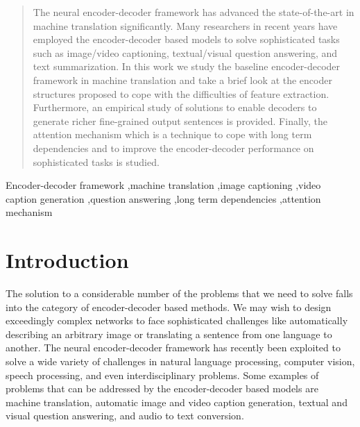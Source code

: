 \documentclass[preprint, 10pt]{elsarticle}
\begin{document}
\begin{frontmatter}
\begin{abstract}
		The neural encoder-decoder framework has advanced the state-of-the-art in machine translation significantly. Many researchers in recent years have employed the encoder-decoder based models to solve sophisticated tasks such as image/video captioning,  textual/visual question answering, and text summarization. In this work we study the baseline encoder-decoder framework in machine translation and take a brief look at the encoder structures proposed to cope with the difficulties of feature extraction. Furthermore, an empirical study of solutions to enable decoders to generate richer fine-grained output sentences is provided. Finally, the attention mechanism which is a technique to cope with long term dependencies and to improve the encoder-decoder performance on sophisticated tasks is studied. 
		
		\end{abstract}
		
		\begin{keyword}
			
			
			Encoder-decoder framework \sep machine translation \sep image captioning \sep video caption generation \sep question answering \sep long term dependencies \sep attention mechanism	
		\end{keyword}
		
	\end{frontmatter}

	
	\section{Introduction}
	The solution to a considerable number of the problems that we need to solve falls into the category of encoder-decoder based methods. We may wish to design exceedingly complex networks to face sophisticated challenges like automatically describing an arbitrary image or translating a sentence from one language to another. The neural encoder-decoder framework has recently been exploited to solve a wide variety of challenges in natural language processing, computer vision, speech processing, and even interdisciplinary problems. Some examples of problems that can be addressed by the encoder-decoder based models are machine translation, automatic image and video caption generation, textual and visual question answering, and audio to text conversion.
	
\end{document}
